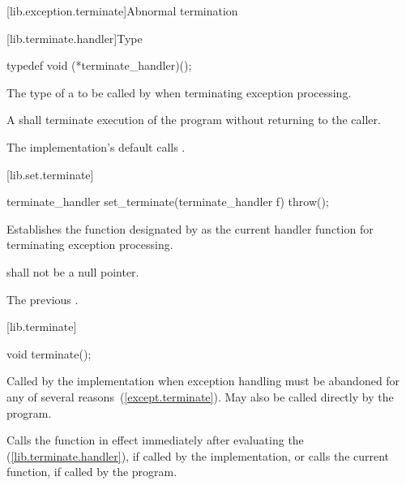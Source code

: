 [lib.exception.terminate]{Abnormal termination}

[lib.terminate.handler]{Type }

%
\begin{itemdecl}
typedef void (*terminate_handler)();
\end{itemdecl}

\begin{itemdescr}
\pnum
The type of a
to be called by
%
when terminating exception processing.

\pnum
\required
A  shall
terminate execution of the program without returning to the caller.

\pnum
{}
The implementation's default  calls
.%
\end{itemdescr}

[lib.set.terminate]{}

%
\begin{itemdecl}
terminate_handler set_terminate(terminate_handler f) throw();
\end{itemdecl}

\begin{itemdescr}
\pnum
\effects
Establishes the function designated by  as the current
handler function for terminating exception processing.

\pnum
\requires {} shall not be a null pointer.

\pnum
\returns
The previous .
\end{itemdescr}

[lib.terminate]{}

%
\begin{itemdecl}
void terminate();
\end{itemdecl}

\begin{itemdescr}
\pnum
Called by the implementation when exception
handling must be abandoned for any of several reasons~(\ref{except.terminate}).
May also be called directly by the program.

\pnum
\effects
Calls the  function in effect immediately after
evaluating the 
(\ref{lib.terminate.handler}),
if called by the implementation, or calls the current
 function, if called by the program.
\end{itemdescr}

